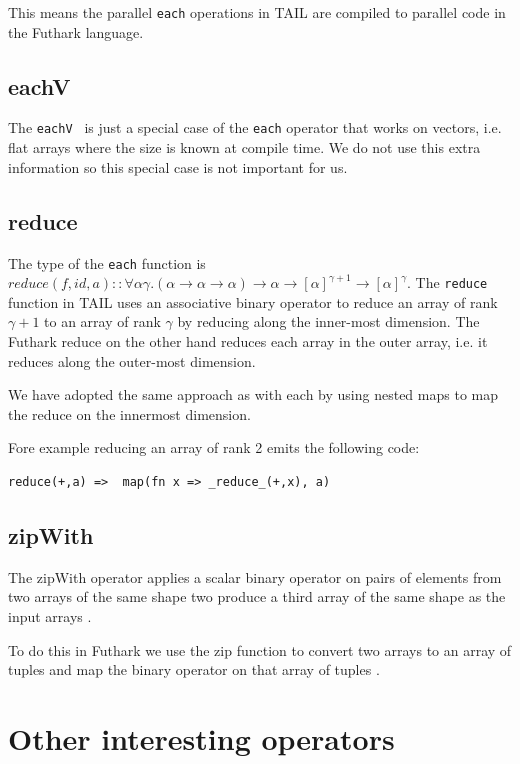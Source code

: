 \documentclass[11pt]{article}
\begin{document}
This means the parallel {\tt each} operations in TAIL are compiled to parallel code in the Futhark language.

\subsection{eachV}
The {\tt eachV } is just a special case of the {\tt each} operator that works on vectors, i.e. flat arrays where the size
is known at compile time. We do not use this extra information so this special case is not important for us.

\subsection{reduce}
The type of the {\tt each} function is $reduce(f,id,a) :: \forall\alpha\gamma.(\alpha \to \alpha \to \alpha) \to \alpha \to [\alpha]^{\gamma+1} \to [\alpha]^\gamma$.
The {\tt reduce} function in TAIL uses an associative binary operator to reduce an array of rank
$\gamma+1$ to an array of rank $\gamma$ by reducing along the inner-most dimension\cite{ElsmanDybdal:Array:2014}.
The Futhark reduce on the other hand reduces each array in the outer array, i.e. it reduces along the outer-most dimension\cite{TroelsHenriksen}. 

We have adopted the same approach as with each by using nested maps to map the reduce on the innermost dimension.

Fore example reducing an array of rank 2 emits the following code:

\begin{lstlisting}[numbers=none,frame=none]
reduce(+,a)	=> 	map(fn x => _reduce_(+,x), a)
\end{lstlisting}

\subsection{zipWith}

The zipWith operator applies a scalar binary operator on pairs of elements from two arrays of the same shape two
produce a third array of the same shape as the input arrays \cite{ElsmanDybdal:Array:2014}.

To do this in Futhark we use the zip function to convert two arrays to an array of tuples and map the binary operator on that array of tuples \cite{TroelsHenriksen}.

\section{Other interesting operators}
\end{document}
